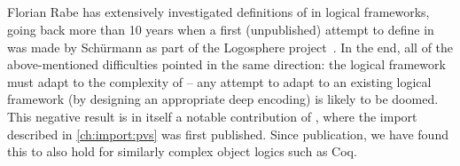 \subparagraph{}
Florian Rabe has extensively investigated definitions of \pvs in logical frameworks, going back more
than 10 years when a first (unpublished) attempt to define \pvs in \LF was made by
Sch\"urmann as part of the Logosphere project~\cite{logosphere}.  In the end, all of the above-mentioned
difficulties pointed in the same direction: the logical framework must adapt to the
complexity of \pvs -- any attempt to adapt \pvs to an existing logical framework (by
designing an appropriate deep encoding) is likely to be doomed.  This negative result is
in itself a notable contribution of \cite{KohMueOwr:mpagsiuf17}, where the \pvs import described in \autoref{ch:import:pvs} was first published.  Since publication, we have found this to also hold for similarly complex object logics such as Coq.

%
%
%
